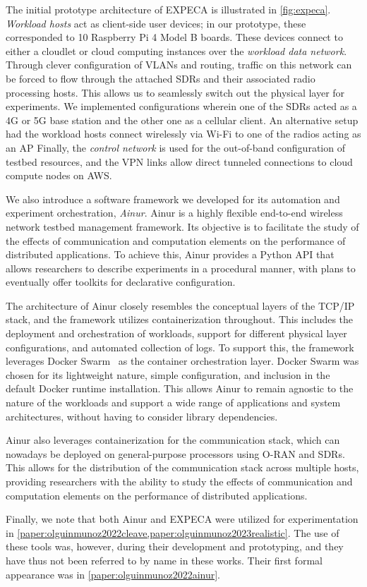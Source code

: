 The initial prototype architecture of \gls{EXPECA} is illustrated in \cref{fig:expeca}.
\emph{Workload hosts} act as client-side user devices;
in our prototype, these corresponded to \num{10} Raspberry Pi 4 Model B boards.
These devices connect to either a cloudlet or cloud computing instances over the \emph{workload data network}.
Through clever configuration of \acsp{VLAN} and routing, traffic on this network can be forced to flow through the attached \acsp{SDR} and their associated radio processing hosts.
This allows us to seamlessly switch out the physical layer for experiments.
We implemented configurations wherein one of the \glspl{SDR} acted as a 4G or 5G base station and the other one as a cellular client.
An alternative setup had the workload hosts connect wirelessly via Wi-Fi to one of the radios acting as an \gls{AP}
Finally, the \emph{control network} is used for the out-of-band configuration of testbed resources, and the \acs{VPN} links allow direct tunneled connections to cloud compute nodes on \acs{AWS}.

We also introduce a software framework we developed for its automation and experiment orchestration, \emph{Ainur}.
Ainur is a highly flexible end-to-end wireless network testbed management framework.
Its objective is to facilitate the study of the effects of communication and computation elements on the performance of distributed applications.
To achieve this, Ainur provides a Python \gls{API} that allows researchers to describe experiments in a procedural manner, with plans to eventually offer toolkits for declarative configuration.

The architecture of Ainur closely resembles the conceptual layers of the \acs{TCP}/\acs{IP} stack, and the framework utilizes containerization throughout.
This includes the deployment and orchestration of workloads, support for different physical layer configurations, and automated collection of logs.
To support this, the framework leverages Docker Swarm~\cite{docker,merkel2014docker,Swarm2021} as the container orchestration layer.
Docker Swarm was chosen for its lightweight nature, simple configuration, and inclusion in the default Docker runtime installation.
This allows Ainur to remain agnostic to the nature of the workloads and support a wide range of applications and system architectures, without having to consider library dependencies.

Ainur also leverages containerization for the communication stack, which can nowadays be deployed on general-purpose processors using \gls{O-RAN} and \glspl{SDR}.
This allows for the distribution of the communication stack across multiple hosts, providing researchers with the ability to study the effects of communication and computation elements on the performance of distributed applications.

Finally, we note that both Ainur and \gls{EXPECA} were utilized for experimentation in \cref{paper:olguinmunoz2022cleave,paper:olguinmunoz2023realistic}.
The use of these tools was, however, during their development and prototyping, and they have thus not been referred to by name in these works.
Their first formal appearance was in \cref{paper:olguinmunoz2022ainur}.

